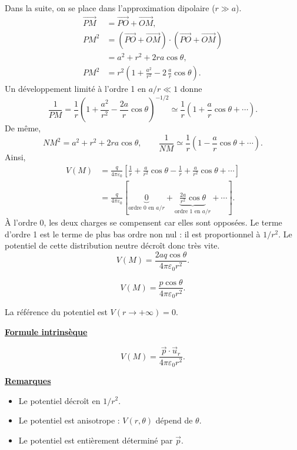 \documentclass[11pt,a4paper]{article}
\newif\ifinexample
\newcommand{\dd}{\mathrm d}
\newcommand{\titr}[1]{\par\ifinexample\else\Needspace{4\baselineskip}\fi\textbf{\underline{#1}}\par\nopagebreak[3]}
\newcommand{\stars}[1]{\mathord{\star}\ifnum#1>1\mkern5mu\mathord{\star}\fi\ifnum#1>2\mkern5mu\mathord{\star}\fi\ifnum#1>3\mkern5mu\mathord{\star}\fi\ifnum#1>4\mkern5mu\mathord{\star}\fi\ifnum#1>5\mkern5mu\mathord{\star}\fi}
\newenvironment{result}[1][4]{\begin{cadre}[etoiles={\stars{#1}}]}{\end{cadre}}
\newcommand{\ur}{\vec u_r}\newcommand{\ut}{\vec u_\theta}\newcommand{\uphi}{\vec u_\varphi}
\newcommand{\eps}{\varepsilon_0}\newcommand{\E}{\vec E}\newcommand{\dS}{\dd\vec S}\newcommand{\dM}{\dd\vec M}
\newcommand{\mom}{\vec p}
\newcommand{\fle}[1]{\overrightarrow{#1}}
\newcommand{\betoile}[2]{\begin{result}[#1]\[#2\]\end{result}}
\begin{document}
Dans la suite, on se place dans l'approximation dipolaire (\(r\gg a\)).
\begin{align*}
 \fle{PM}&=\fle{PO}+\fle{OM},\\
 PM^2&=(\fle{PO}+\fle{OM})\cdot(\fle{PO}+\fle{OM})\\
     &=a^2+r^2+2ra\cos\theta,\\
 PM^2&=r^2\left(1+\frac{a^2}{r^2}-2\,\frac ar\cos\theta\right).
\end{align*}
\label{err:pm}
Un développement limité à l'ordre 1 en \(a/r\ll1\) donne
\[
 \frac1{PM}=\frac1r\left(1+\frac{a^2}{r^2}-\frac{2a}r\cos\theta\right)^{-1/2}
 \simeq\frac1r\left(1+\frac ar\cos\theta+\cdots\right).
\]
De même,
\[
 NM^2=a^2+r^2+2ra\cos\theta,\qquad
 \frac1{NM}\simeq\frac1r\left(1-\frac ar\cos\theta+\cdots\right).
\]
Ainsi,
\begin{align*}
 V(M)&=\frac{q}{4\pi\eps}
 \left[\frac1r+\frac a{r^2}\cos\theta-\frac1r+\frac a{r^2}\cos\theta+\cdots\right]\\
 &=\frac{q}{4\pi\eps}\left[
 \underbrace{0}_{\text{ordre 0 en }a/r}
 +\underbrace{\frac{2a}{r^2}\cos\theta}_{\text{ordre 1 en }a/r}+\cdots\right].
\end{align*}
À l'ordre 0, les deux charges se compensent car elles sont opposées. Le terme d'ordre 1
est le terme de plus bas ordre non nul : il est proportionnel à \(1/r^2\).
Le potentiel de cette distribution neutre décroît donc très vite.
\[
 V(M)=\frac{2aq\cos\theta}{4\pi\eps r^2}.
\]
\betoile{5}{V(M)=\frac{p\cos\theta}{4\pi\eps r^2}.}
La référence du potentiel est \(V(r\to+\infty)=0\).

\titr{Formule intrinsèque}
\betoile{4}{V(M)=\frac{\mom\cdot\ur}{4\pi\eps r^2}.}
\titr{Remarques}
\begin{itemize}
\item Le potentiel décroît en \(1/r^2\).
\item Le potentiel est anisotrope : \(V(r,\theta)\) dépend de \(\theta\).
\item Le potentiel est entièrement déterminé par \(\mom\).
\end{itemize}

\end{document}
